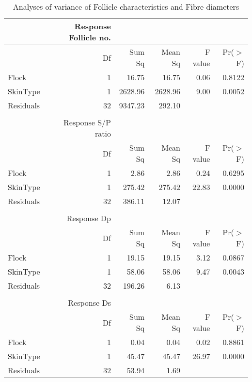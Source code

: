 \begin{table}[ht]
\centering
\caption{Analyses of variance of Follicle characteristics and Fibre diameters}
\label{tab:follmeasaov}
\vspace{0.1in}


\begin{tabular}{lrrrrr}
 & Response Follicle no. & & & \\
  \hline
 & Df & Sum Sq & Mean Sq & F value & Pr($>$F) \\ 
  \hline
Flock & 1 & 16.75 & 16.75 & 0.06 & 0.8122 \\ 
  SkinType & 1 & 2628.96 & 2628.96 & 9.00 & 0.0052 \\ 
  Residuals & 32 & 9347.23 & 292.10 &  &  \\ 
   \hline
\\

 & Response S/P ratio  & & & \\
  \hline
 & Df & Sum Sq & Mean Sq & F value & Pr($>$F) \\ 
  \hline
Flock & 1 & 2.86 & 2.86 & 0.24 & 0.6295 \\ 
  SkinType & 1 & 275.42 & 275.42 & 22.83 & 0.0000 \\ 
  Residuals & 32 & 386.11 & 12.07 &  &  \\ 
   \hline
\\

& Response Dp      & & & \\
  \hline
 & Df & Sum Sq & Mean Sq & F value & Pr($>$F) \\ 
  \hline
Flock & 1 & 19.15 & 19.15 & 3.12 & 0.0867 \\ 
  SkinType & 1 & 58.06 & 58.06 & 9.47 & 0.0043 \\ 
  Residuals & 32 & 196.26 & 6.13 &  &  \\ 
   \hline
\\


& Response Ds     & & & \\
  \hline
 & Df & Sum Sq & Mean Sq & F value & Pr($>$F) \\ 
  \hline
Flock & 1 & 0.04 & 0.04 & 0.02 & 0.8861 \\ 
  SkinType & 1 & 45.47 & 45.47 & 26.97 & 0.0000 \\ 
  Residuals & 32 & 53.94 & 1.69 &  &  \\ 
   \hline
\end{tabular}
\end{table}

